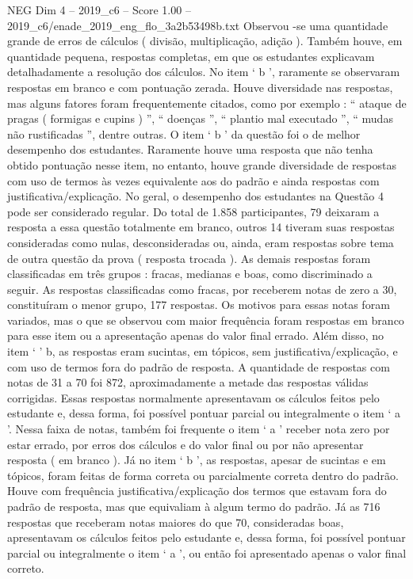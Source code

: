 \begin{textsample}{NEG Dim 4 – 2019\_c6 – Score 1.00 – 2019\_c6/enade\_2019\_eng\_flo\_3a2b53498b.txt}
Observou -se uma quantidade grande de erros de cálculos ( divisão, multiplicação, adição ).
Também houve, em quantidade pequena, respostas completas, em que os estudantes explicavam detalhadamente a resolução dos cálculos.
No item ‘ b ’, raramente se observaram respostas em branco e com pontuação zerada.
Houve diversidade nas respostas, mas alguns fatores foram frequentemente citados, como por exemplo : “ ataque de pragas ( formigas e cupins ) ”, “ doenças ”, “ plantio mal executado ”, “ mudas não rustificadas ”, dentre outras.
O item ‘ b ’ da questão foi o de melhor desempenho dos estudantes.
Raramente houve uma resposta que não tenha obtido pontuação nesse item, no entanto, houve grande diversidade de respostas com uso de termos às vezes equivalente aos do padrão e ainda respostas com justificativa/explicação.
No geral, o desempenho dos estudantes na Questão 4 pode ser considerado regular.
Do total de 1.858 participantes, 79 deixaram a resposta a essa questão totalmente em branco, outros 14 tiveram suas respostas consideradas como nulas, desconsideradas ou, ainda, eram respostas sobre tema de outra questão da prova ( resposta trocada ).
As demais respostas foram classificadas em três grupos : fracas, medianas e boas, como discriminado a seguir.
As respostas classificadas como fracas, por receberem notas de zero a 30, constituíram o menor grupo, 177 respostas.
Os motivos para essas notas foram variados, mas o que se observou com maior frequência foram respostas em branco para esse item ou a apresentação apenas do valor final errado.
Além disso, no item ‘ ’ b, as respostas eram sucintas, em tópicos, sem justificativa/explicação, e com uso de termos fora do padrão de resposta.
A quantidade de respostas com notas de 31 a 70 foi 872, aproximadamente a metade das respostas válidas corrigidas.
Essas respostas normalmente apresentavam os cálculos feitos pelo estudante e, dessa forma, foi possível pontuar parcial ou integralmente o item ‘ a ’.
Nessa faixa de notas, também foi frequente o item ‘ a ’ receber nota zero por estar errado, por erros dos cálculos e do valor final ou por não apresentar resposta ( em branco ).
Já no item ‘ b ’, as respostas, apesar de sucintas e em tópicos, foram feitas de forma correta ou parcialmente correta dentro do padrão.
Houve com frequência justificativa/explicação dos termos que estavam fora do padrão de resposta, mas que equivaliam à algum termo do padrão.
Já as 716 respostas que receberam notas maiores do que 70, consideradas boas, apresentavam os cálculos feitos pelo estudante e, dessa forma, foi possível pontuar parcial ou integralmente o item ‘ a ’, ou então foi apresentado apenas o valor final correto.

\end{textsample}
